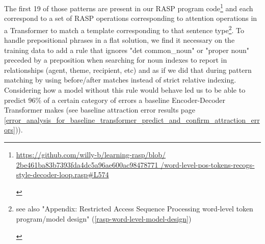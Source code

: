 \documentclass[11pt]{article}
\begin{document}
The first 19 of those patterns are present in our RASP program code\footnote{\begin{footnotesize}\href{https://github.com/willy-b/learning-rasp/blob/2be461ba83b7393fda4dc5a96ae600ac98478771/word-level-pos-tokens-recogs-style-decoder-loop.rasp\#L574}{https://github.com/willy-b/learning-rasp/blob/
2be461ba83b7393fda4dc5a96ae600ac98478771
/word-level-pos-tokens-recogs-style-decoder-loop.rasp\#L574}\end{footnotesize}}
and each correspond to a set of RASP operations corresponding to attention operations in a Transformer to match a template corresponding to that sentence type\footnote{\begin{footnotesize}see also "Appendix: Restricted Access Sequence Processing word-level token program/model design" (\ref{rasp-word-level-model-design})\end{footnotesize}}.
To handle prepositional phrases in a flat solution, we find it necessary on the training data to add a rule that ignores "det common\_noun" or "proper noun" preceded by a preposition when searching for noun indexes to report in relationships (agent, theme, recipient, etc) and as if we did that during pattern matching by using before/after matches instead of strict relative indexing. Considering how a model without this rule would behave led us to be able to predict 96\% of a certain category of errors a baseline Encoder-Decoder Transformer makes (see baseline attraction error results page \ref{error_analysis_for_baseline_transformer_predict_and_confirm_attraction_errors})).
\end{document}
